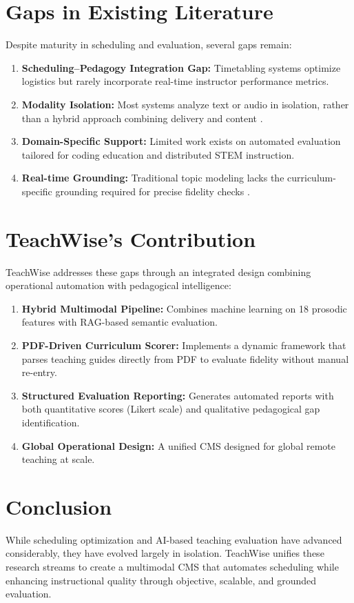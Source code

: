 \section{Gaps in Existing Literature}
Despite maturity in scheduling and evaluation, several gaps remain:
\begin{enumerate}
    \item \textbf{Scheduling–Pedagogy Integration Gap:} Timetabling systems optimize logistics but rarely incorporate real-time instructor performance metrics.
    \item \textbf{Modality Isolation:} Most systems analyze text or audio in isolation, rather than a hybrid approach combining delivery and content \cite{Stone2019}.
    \item \textbf{Domain-Specific Support:} Limited work exists on automated evaluation tailored for coding education and distributed STEM instruction.
    \item \textbf{Real-time Grounding:} Traditional topic modeling lacks the curriculum-specific grounding required for precise fidelity checks \cite{Grootendorst2022}.
\end{enumerate}

\section{TeachWise’s Contribution}
TeachWise addresses these gaps through an integrated design combining operational automation with pedagogical intelligence:
\begin{enumerate}
    \item \textbf{Hybrid Multimodal Pipeline:} Combines machine learning on 18 prosodic features with RAG-based semantic evaluation.
    \item \textbf{PDF-Driven Curriculum Scorer:} Implements a dynamic framework that parses teaching guides directly from PDF to evaluate fidelity without manual re-entry.
    \item \textbf{Structured Evaluation Reporting:} Generates automated reports with both quantitative scores (Likert scale) and qualitative pedagogical gap identification.
    \item \textbf{Global Operational Design:} A unified CMS designed for global remote teaching at scale.
\end{enumerate}

\section{Conclusion}
While scheduling optimization and AI-based teaching evaluation have advanced considerably, they have evolved largely in isolation. TeachWise unifies these research streams to create a multimodal CMS that automates scheduling while enhancing instructional quality through objective, scalable, and grounded evaluation.